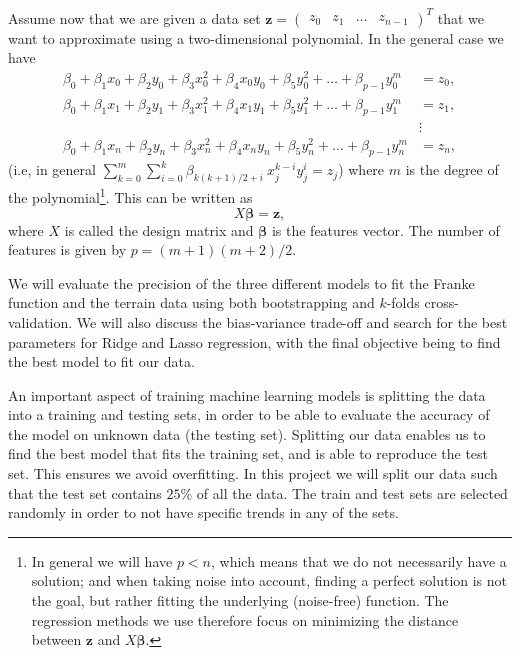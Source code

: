 \documentclass[10pt, a4paper]{article}
\begin{document}
    Assume now that we are given a data set \(\bm{z}=\begin{pmatrix}z_0 & z_1 & \ldots & z_{n-1}\end{pmatrix}^T\) that we want to approximate using a two-dimensional polynomial. In the general case we have
    \begin{align*}
        \beta_0 + \beta_1x_0 + \beta_2y_0 + \beta_3x_0^2 + \beta_4x_0y_0 + \beta_5y_0^2 + \ldots + \beta_{p-1}y_0^m &= z_0,
        \\
        \beta_0 + \beta_1x_1 + \beta_2y_1 + \beta_3x_1^2 + \beta_4x_1y_1 + \beta_5y_1^2 + \ldots + \beta_{p-1}y_1^m &= z_1,
        \\
        &\vdots
        \\
        \beta_0 + \beta_1x_n + \beta_2y_n + \beta_3x_n^2 + \beta_4x_ny_n + \beta_5y_n^2 + \ldots + \beta_{p-1}y_n^m &= z_n,
    \end{align*}
    (i.e, in general \(\sum_{k = 0}^{m}\sum_{i = 0}^{k}\beta_{k(k+1)/2+i}\ x_j^{k-i}y_j^i=z_j\)) where \(m\) is the degree of the polynomial\footnote{In general we will have \(p<n\), which means that we do not necessarily have a solution; and when taking noise into account, finding a perfect solution is not the goal, but rather fitting the underlying (noise-free) function. The regression methods we use therefore focus on minimizing the distance between \(\bm{z}\) and \(X\bm{\beta}\).}. This can be written as
    \begin{equation*}
        X\bm{\beta}=\bm{z},
    \end{equation*}
    where \(X\) is called the design matrix and \(\bm{\beta}\) is the features vector. The number of features is given by $p=(m+1)(m+2)/2$.
    
    We will evaluate the precision of the three different models to fit the Franke function and the terrain data using both bootstrapping and $k$-folds cross-validation. We will also discuss the bias-variance trade-off and search for the best parameters for Ridge and Lasso regression, with the final objective being to find the best model to fit our data.
    
    An important aspect of training machine learning models is splitting the data into a training and testing sets, in order to be able to evaluate the accuracy of the model on unknown data (the testing set). Splitting our data enables us to find the best model that fits the training set, and is able to reproduce the test set. This ensures we avoid overfitting. In this project we will split our data such that the test set contains $25\%$ of all the data. The train and test sets are selected randomly in order to not have specific trends in any of the sets.
    
\end{document}
